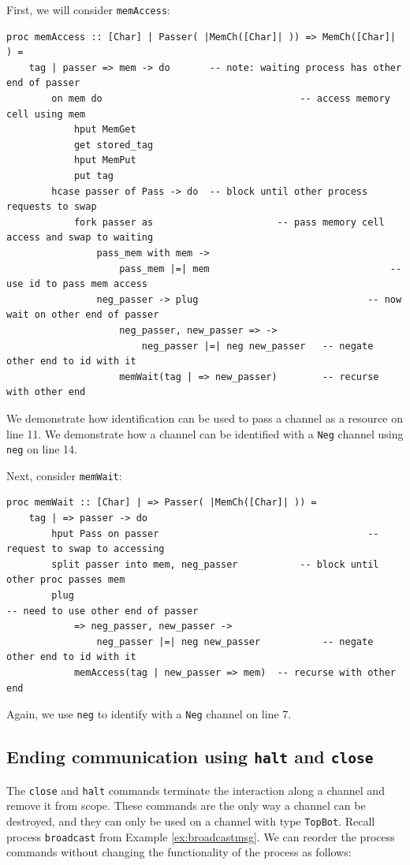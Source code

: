 \documentclass[11pt]{article}
\begin{document}
First, we will consider \lstinline$memAccess$:
\begin{lstlisting}
proc memAccess :: [Char] | Passer( |MemCh([Char]| )) => MemCh([Char]| ) =
	tag | passer => mem -> do		-- note: waiting process has other end of passer
		on mem do									-- access memory cell using mem
			hput MemGet
			get stored_tag
			hput MemPut
			put tag
		hcase passer of Pass -> do	-- block until other process requests to swap
			fork passer as						-- pass memory cell access and swap to waiting
				pass_mem with mem -> 
					pass_mem |=| mem								-- use id to pass mem access
				neg_passer -> plug								-- now wait on other end of passer
					neg_passer, new_passer => ->		
						neg_passer |=| neg new_passer	-- negate other end to id with it	
					memWait(tag | => new_passer)		-- recurse with other end
\end{lstlisting}
We demonstrate how identification can be used to pass a channel as a resource on line 11.
We demonstrate how a channel can be identified with a \lstinline$Neg$ channel using \lstinline$neg$ on line 14.

Next, consider \lstinline$memWait$:
\begin{lstlisting}
proc memWait :: [Char] | => Passer( |MemCh([Char]| )) =
	tag | => passer -> do
		hput Pass on passer										-- request to swap to accessing
		split passer into mem, neg_passer			-- block until other proc passes mem
		plug																	-- need to use other end of passer
			=> neg_passer, new_passer -> 
				neg_passer |=| neg new_passer			-- negate other end to id with it	
			memAccess(tag | new_passer => mem)	-- recurse with other end
\end{lstlisting}
Again, we use  \lstinline$neg$ to identify with a \lstinline$Neg$ channel on line 7.


\subsection{Ending communication using {\tt halt} and {\tt close}}
\label{sec:close}

The \lstinline$close$ and \lstinline$halt$ commands terminate the interaction along a channel and remove it from scope. 
These commands are the only way a channel can be destroyed, and they can only be used on a channel with type \lstinline$TopBot$.
Recall process \lstinline$broadcast$ from Example \ref{ex:broadcastmsg}.
We can reorder the process commands without changing the functionality of the process as follows:
\end{document}

